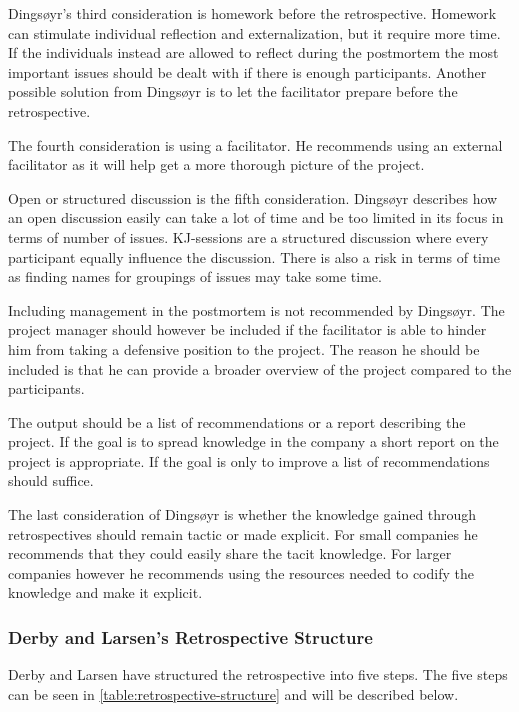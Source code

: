 Dingsøyr's third consideration is homework before the retrospective. Homework can stimulate individual reflection and externalization, but it require more time. If the individuals instead are allowed to reflect during the postmortem the most important issues should be dealt with if there is enough participants. Another possible solution from Dingsøyr is to let the facilitator prepare before the retrospective. 

The fourth consideration is using a facilitator. He recommends using an external facilitator as it will help get a more thorough picture of the project.

Open or structured discussion is the fifth consideration. Dingsøyr describes how an open discussion easily can take a lot of time and be too limited in its focus in terms of number of issues. KJ-sessions are a structured discussion where every participant equally influence the discussion. There is also a risk in terms of time as finding names for groupings of issues may take some time. 

Including management in the postmortem is not recommended by Dingsøyr. The project manager should however be included if the facilitator is able to hinder him from taking a defensive position to the project. The reason he should be included is that he can provide a broader overview of the project compared to the participants. 

The output should be a list of recommendations or a report describing the project. If the goal is to spread knowledge in the company a short report on the project is appropriate. If the goal is only to improve a list of recommendations should suffice. 

The last consideration of Dingsøyr is whether the knowledge gained through retrospectives should remain tactic or made explicit. For small companies he recommends that they could easily share the tacit knowledge. For larger companies however he recommends using the resources needed to codify the knowledge and make it explicit. 

\subsubsection{Derby and Larsen's Retrospective Structure}
Derby and Larsen \cite{Larsen2006} have structured the retrospective into five steps. The five steps can be seen in \autoref{table:retrospective-structure} and will be described below. 

